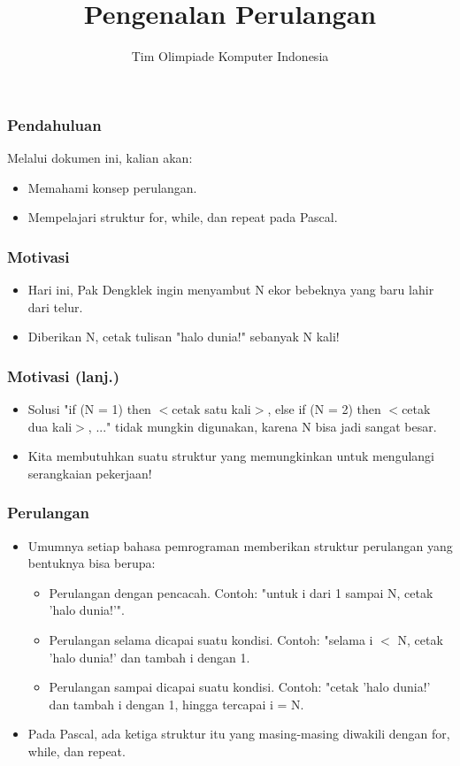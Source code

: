 \documentclass{beamer}
\title{Pengenalan Perulangan}
\author{Tim Olimpiade Komputer Indonesia}
\begin{document}
\begin{frame}
\titlepage
\end{frame}

\begin{frame}
\frametitle{Pendahuluan}
Melalui dokumen ini, kalian akan:
\begin{itemize}
	\item Memahami konsep perulangan.
	\item Mempelajari struktur for, while, dan repeat pada Pascal.
\end{itemize}
\end{frame}

\begin{frame}
\frametitle{Motivasi}
\begin{itemize}
	\item Hari ini, Pak Dengklek ingin menyambut N ekor bebeknya yang baru lahir dari telur.
	\item Diberikan N, cetak tulisan "halo dunia!" sebanyak N kali!
\end{itemize}
\end{frame}

\begin{frame}
\frametitle{Motivasi (lanj.)}
\begin{itemize}
	\item Solusi "if (N = 1) then $<$cetak satu kali$>$, else if (N = 2) then $<$cetak dua kali$>$, ..." tidak mungkin digunakan, karena N bisa jadi sangat besar.
	\item Kita membutuhkan suatu struktur yang memungkinkan untuk mengulangi serangkaian pekerjaan!
\end{itemize}
\end{frame}

\begin{frame}
\frametitle{Perulangan}
\begin{itemize}
	\item Umumnya setiap bahasa pemrograman memberikan struktur perulangan yang bentuknya bisa berupa:
	\begin{itemize}
		\item Perulangan dengan pencacah. Contoh: "untuk i dari 1 sampai N, cetak 'halo dunia!'".
		\item Perulangan selama dicapai suatu kondisi. Contoh: "selama i $<$ N, cetak 'halo dunia!' dan tambah i dengan 1.
		\item Perulangan sampai dicapai suatu kondisi. Contoh: "cetak 'halo dunia!' dan tambah i dengan 1, hingga tercapai i = N.
	\end{itemize}
	\item Pada Pascal, ada ketiga struktur itu yang masing-masing diwakili dengan \alert{for}, \alert{while}, dan \alert{repeat}. 
\end{itemize}
\end{frame}
\end{document}
